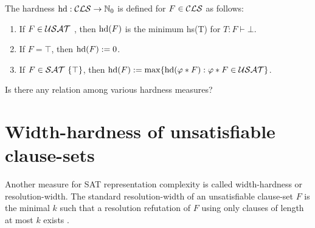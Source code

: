 \documentclass[]{book}
\begin{document}
\begin{defi}\label{def:ex-hardness}
\cite{h11} The hardness $\operatorname{hd} : \mathcal{CLS} \rightarrow \mathbb{N}_0$ is defined for $F \in \mathcal{CLS}$ as follows:
\begin{enumerate}
  \item If $F \in \mathcal{USAT}$ , then $\operatorname{hd}(F)$ is the minimum hs(T) for $T : F \vdash \bot$.
  \item If $F = \top$, then $\operatorname{hd}(F) := 0$.
  \item If $F \in \mathcal{SAT} \ \{ \top \}$, then $\operatorname{hd}(F) := \max \{ \operatorname{hd}(\varphi * F) : \varphi * F \in \mathcal{USAT} \}$.
  \end{enumerate}
\end{defi}
\begin{quest}\label{que:hardness_measures}
      Is there any relation among various hardness measures?
\end{quest}
\section{Width-hardness of unsatisfiable clause-sets}
\label{sec:whdd}

Another measure for SAT representation complexity is called width-hardness or resolution-width. The standard resolution-width of an 
unsatisfiable clause-set $F$ is the minimal $k$ such that a resolution refutation of $F$ using only clauses of length at most $k$ exists \cite{h20}.
\end{document}

